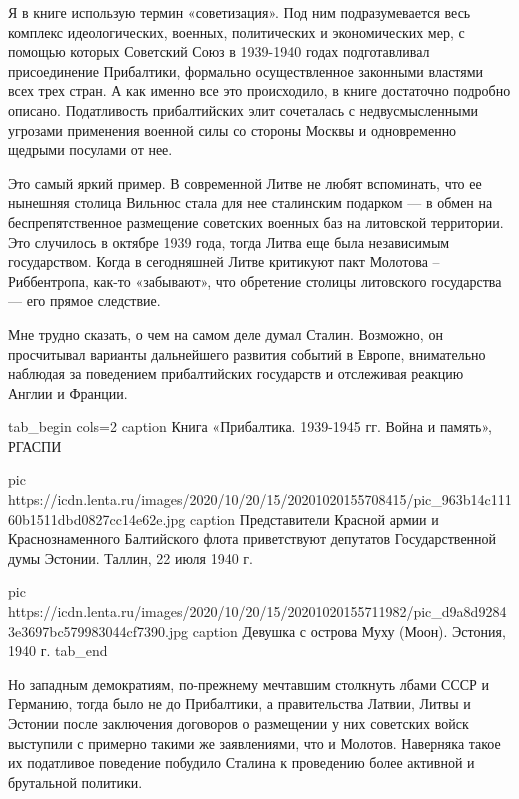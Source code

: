 Я в книге использую термин «советизация». Под ним подразумевается весь комплекс
идеологических, военных, политических и экономических мер, с помощью которых
Советский Союз в 1939-1940 годах подготавливал присоединение Прибалтики,
формально осуществленное законными властями всех трех стран. А как именно все
это происходило, в книге достаточно подробно описано. Податливость
прибалтийских элит сочеталась с недвусмысленными угрозами применения военной
силы со стороны Москвы и одновременно щедрыми посулами от нее.


Это самый яркий пример. В современной Литве не любят вспоминать, что ее
нынешняя столица Вильнюс стала для нее сталинским подарком — в обмен на
беспрепятственное размещение советских военных баз на литовской территории. Это
случилось в октябре 1939 года, тогда Литва еще была независимым государством.
Когда в сегодняшней Литве критикуют пакт Молотова – Риббентропа, как-то
«забывают», что обретение столицы литовского государства — его прямое
следствие.


Мне трудно сказать, о чем на самом деле думал Сталин. Возможно, он просчитывал
варианты дальнейшего развития событий в Европе, внимательно наблюдая за
поведением прибалтийских государств и отслеживая реакцию Англии и Франции.

\ifcmt
tab_begin cols=2
	caption Книга «Прибалтика. 1939-1945 гг. Война и память», РГАСПИ

	pic https://icdn.lenta.ru/images/2020/10/20/15/20201020155708415/pic_963b14c11160b1511dbd0827cc14e62e.jpg
	caption Представители Красной армии и Краснознаменного Балтийского флота приветствуют депутатов Государственной думы Эстонии. Таллин, 22 июля 1940 г.

	pic https://icdn.lenta.ru/images/2020/10/20/15/20201020155711982/pic_d9a8d92843e3697bc579983044cf7390.jpg
	caption Девушка с острова Муху (Моон). Эстония, 1940 г. 
tab_end
\fi

Но западным демократиям, по-прежнему мечтавшим столкнуть лбами СССР и Германию,
тогда было не до Прибалтики, а правительства Латвии, Литвы и Эстонии после
заключения договоров о размещении у них советских войск выступили с примерно
такими же заявлениями, что и Молотов. Наверняка такое их податливое поведение
побудило Сталина к проведению более активной и брутальной политики.


